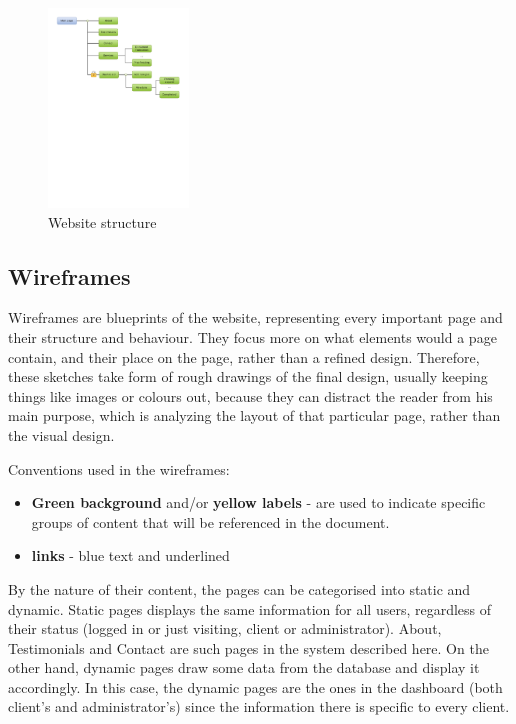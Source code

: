 \documentclass{l3proj}
\begin{document}
\begin{figure}
\centering
\includegraphics[height=200px, trim=0px 450px 0px 100px]{website-structure}
\caption{Website structure}
\label{website-structure}
\end{figure}

\newpage
\subsection{Wireframes}
% 
% 
Wireframes are blueprints of the website, representing every important page and 
their structure and behaviour.
They focus more on what elements would a page contain, and their place on
the page, rather than a refined design. Therefore, these sketches take form of
rough drawings of the final design, usually keeping things like images or
colours out, because they can distract the reader from his main purpose, which
is analyzing the layout of that particular page, rather than the visual design.


Conventions used in the wireframes:
\begin{itemize} \itemsep1pt \parskip0pt 
	\item \textbf{Green background} and/or \textbf{yellow labels} - are used to
	indicate specific groups of content that will be referenced in the document.
	\item \textbf{links} - blue text and underlined
\end{itemize}

By the nature of their content, the pages can be categorised into static and
dynamic. Static pages displays the same information for all users, regardless of
their status (logged in or just visiting, client or administrator). About,
Testimonials and Contact are such pages in the system described here. On the
other hand, dynamic pages draw some data from the database and display it
accordingly. In this case, the dynamic pages are the ones in the dashboard
(both client’s and administrator’s) since the information there is specific to
every client.
\end{document}

